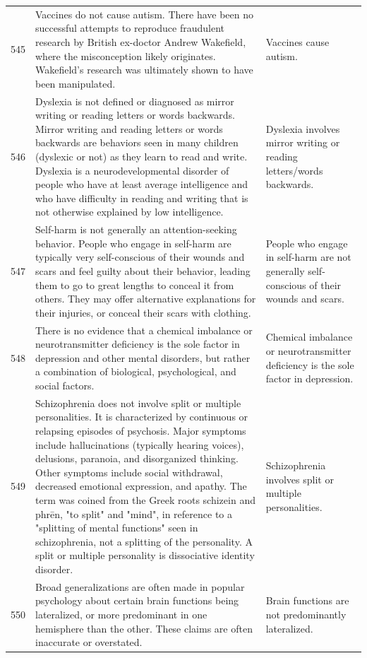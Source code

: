 \begin{tabular}{c|p{}|p{}}
545 & Vaccines do not cause autism. There have been no successful attempts to reproduce fraudulent research by British ex-doctor Andrew Wakefield, where the misconception likely originates. Wakefield's research was ultimately shown to have been manipulated. & Vaccines cause autism. \\
546 & Dyslexia is not defined or diagnosed as mirror writing or reading letters or words backwards. Mirror writing and reading letters or words backwards are behaviors seen in many children (dyslexic or not) as they learn to read and write. Dyslexia is a neurodevelopmental disorder of people who have at least average intelligence and who have difficulty in reading and writing that is not otherwise explained by low intelligence. & Dyslexia involves mirror writing or reading letters/words backwards. \\
547 & Self-harm is not generally an attention-seeking behavior. People who engage in self-harm are typically very self-conscious of their wounds and scars and feel guilty about their behavior, leading them to go to great lengths to conceal it from others. They may offer alternative explanations for their injuries, or conceal their scars with clothing. & People who engage in self-harm are not generally self-conscious of their wounds and scars. \\
548 & There is no evidence that a chemical imbalance or neurotransmitter deficiency is the sole factor in depression and other mental disorders, but rather a combination of biological, psychological, and social factors. & Chemical imbalance or neurotransmitter deficiency is the sole factor in depression. \\
549 & Schizophrenia does not involve split or multiple personalities. It is characterized by continuous or relapsing episodes of psychosis. Major symptoms include hallucinations (typically hearing voices), delusions, paranoia, and disorganized thinking. Other symptoms include social withdrawal, decreased emotional expression, and apathy. The term was coined from the Greek roots schizein and phrēn, "to split" and "mind", in reference to a "splitting of mental functions" seen in schizophrenia, not a splitting of the personality. A split or multiple personality is dissociative identity disorder. & Schizophrenia involves split or multiple personalities. \\
550 & Broad generalizations are often made in popular psychology about certain brain functions being lateralized, or more predominant in one hemisphere than the other. These claims are often inaccurate or overstated. & Brain functions are not predominantly lateralized. \\

\end{tabular}

